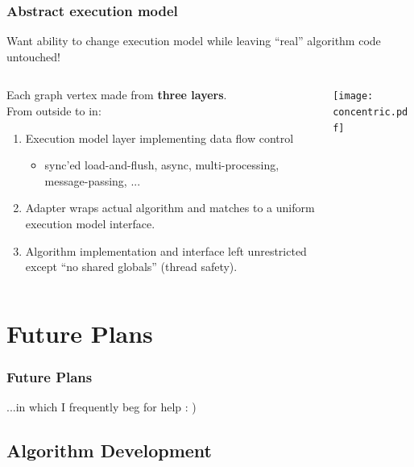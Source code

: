 \documentclass[xcolor=dvipsnames]{beamer}
\begin{document}
\begin{frame}
  \frametitle{Abstract execution model}

  \scriptsize Want ability to change execution model while leaving ``real'' algorithm code untouched!

\footnotesize
  
  \begin{columns}
    \begin{column}{0.6\textwidth}
      Each graph vertex made from \textbf{three layers}.\\
      From outside to in:
      \begin{enumerate}
      \item Execution model layer implementing data flow control
        \begin{itemize}\scriptsize
        \item sync'ed load-and-flush, async, multi-processing, message-passing, ...
        \end{itemize}
      \item Adapter wraps actual algorithm and matches to a uniform execution model interface.
      \item Algorithm implementation and interface left unrestricted
        except ``no shared globals'' (thread safety).
      \end{enumerate}
    \end{column}
    \begin{column}{0.4\textwidth}
      \texttt{[image: concentric.pdf]}      
    \end{column}
  \end{columns}

\end{frame}

\section{Future Plans}

\begin{frame}
\end{frame}

\begin{frame}\frametitle{Future Plans}
  \begin{center}
    ...in which I frequently beg for help : )
  \end{center}
\end{frame}

\subsection{Algorithm Development}
\end{document}
